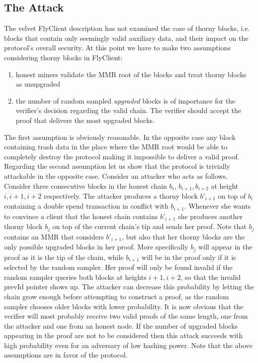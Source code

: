\subsection{The Attack}
	The  velvet FlyClient description has not examined the case of thorny blocks, i.e. blocks that contain only seemingly valid auxiliary data, and their impact on the protocol's overall security.
	At this point we have to make two assumptions considering thorny blocks in FlyClient:
	\begin{enumerate}
		\item honest miners validate the MMR root of the blocks and treat thorny blocks as unupgraded
		\item the number of random sampled \emph{upgraded} blocks is of importance for the verifier's decision regarding the valid chain. The verifier should accept the proof that delivers the most upgraded blocks.
	\end{enumerate}
    The first assumption is obviously reasonable. In the opposite case any block containing trash data in the place where the MMR root would be able to 
    completely destroy the protocol making it impossible to deliver a valid proof.
	Regarding the second assumption let us show that the protocol is trivially attackable in the opposite case. Consider an attacker who acts as follows.
	Consider three consecutive blocks in the honest chain $b_i$, $b_{i+1}, b_{i+2}$ at height $i, i+1, i+2$ respectively. The attacker produces a thorny block $b'_{i+1}$ on top of $b_i$ containing a double spend transaction in conflict with $b_{i+1}$. 
	Whenever she wants to convince a client that the honest chain contains $b'_{i+1}$ she produces another thorny block $b_j$ on top of the current chain's tip and sends her proof. Note that $b_j$ contains an MMR that considers 
	$b'_{i+1}$, but also that her thorny blocks are the only possible upgraded blocks in her proof. More specifically $b_j$ will appear in the proof as it is the tip of the chain, while $b_{i+1}$ will be in the proof 
	only if it is selected by the random sampler. Her proof will only be found invalid if the random sampler queries both blocks at heights $i+1, i+2$, so that the invalid prevId pointer shows up. The attacker can decrease this probability
	by letting the chain grow enough before attempting to construct a proof, as the random sampler chooses older blocks with lower probability. It is now obvious that the verifier will most probably receive two valid proofs of the same length, one from the attacker and one from an honest node.
	If the number of upgraded blocks appearing in the proof are not to be considered then this attack succeeds with high probability even for an adversary of low hashing power.
	Note that the above assumptions are in favor of the protocol. 

